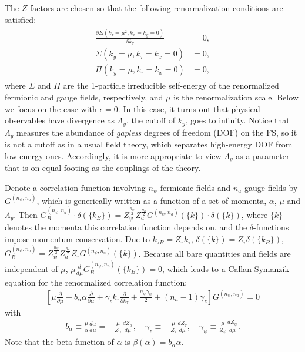 \documentclass[prx,amsmath,amssymb, notitlepage, onecolumn,
nofootinbib,
superscriptaddress,
longbibliography
]{revtex4-1}
\newcommand{\beq}{\begin{eqnarray}}
\newcommand{\eeq}{\end{eqnarray}}
\begin{document}
The $Z$ factors are chosen so that the following renormalization conditions are satisfied:
\beq \label{eq: renormalization conditions 1}
\begin{split}
\frac{\partial\Sigma(k_\tau=\mu^2, k_x=k_y=0)}{\partial k_\tau}&=0,\\
\Sigma(k_y=\mu, k_\tau=k_x=0)&=0,\\
\Pi(k_y=\mu, k_\tau=k_x=0)&=0,
\end{split}
\eeq
where $\Sigma$ and $\Pi$ are the 1-particle irreducible self-energy of the renormalized fermionic and gauge fields, respectively, and $\mu$ is the renormalization scale. Below we focus on the case with $\epsilon=0$. 
In this case, 
it turns out that physical observables have divergence as $\Lambda_y$, the cutoff of $k_y$, goes to infinity. Notice that $\Lambda_y$ measures the abundance of {\it gapless} degrees of freedom (DOF) on the FS, so it is not a cutoff as in a usual field theory, which separates high-energy DOF from low-energy ones. Accordingly, it is more appropriate to view $\Lambda_y$ as a parameter that is on equal footing as the couplings of the theory.

Denote a correlation function involving $n_\psi$ fermionic fields and $n_a$ gauge fields by $G^{(n_\psi, n_a)}$, which is generically written as a function of a set of momenta, $\alpha$, $\mu$ and $\Lambda_y$. Then $G^{(n_\psi, n_a)}_B\cdot \delta(\{k_B\})=Z_\psi^{\frac{n_\psi}{2}}Z_a^{\frac{n_a}{2}}G^{(n_\psi, n_a)}(\{k\})\cdot \delta(\{k\})$, where $\{k\}$ denotes the momenta this correlation function depends on, and the $\delta$-functions impose momentum conservation. 
Due to $k_{\tau B}=Z_\tau k_\tau$, $\delta(\{k\})=Z_\tau\delta(\{k_B\})$, $G_B^{(n_\psi, n_a)}=Z_\psi^{\frac{n_\psi}{2}}Z_a^{\frac{n_a}{2}}Z_\tau G^{(n_\psi, n_a)}(\{k\})$. Because all bare quantities and fields are independent of $\mu$, $\mu\frac{d}{d\mu}G^{(n_\psi, n_a)}_B(\{k_B\})=0$, which leads to a Callan-Symanzik equation for the renormalized correlation function:
\beq \label{eq: Callan-Symanzik 1}
\left[\mu\frac{\partial}{\partial\mu}+b_{\alpha}\alpha\frac{\partial}{\partial\alpha}+\gamma_zk_\tau\frac{\partial}{\partial k_\tau}+\frac{n_\psi\gamma_\psi}{2}+(n_a-1)\gamma_z\right]G^{(n_\psi, n_a)}=0
\eeq
with
\beq \label{eq: RG quantities}
b_{\alpha}\equiv\frac{\mu}{\alpha}\frac{d\alpha}{d\mu}=-\frac{\mu}{Z_{\alpha}}\frac{d Z_{\alpha}}{d\mu},
\quad
\gamma_z\equiv-\frac{\mu}{Z_\tau}\frac{dZ_\tau}{d\mu},
\quad
\gamma_\psi\equiv\frac{\mu}{Z_\psi}\frac{dZ_\psi}{d\mu}.
\eeq
Note that the beta function of $\alpha$ is $\beta(\alpha)=b_{\alpha}\alpha$.
\end{document}
